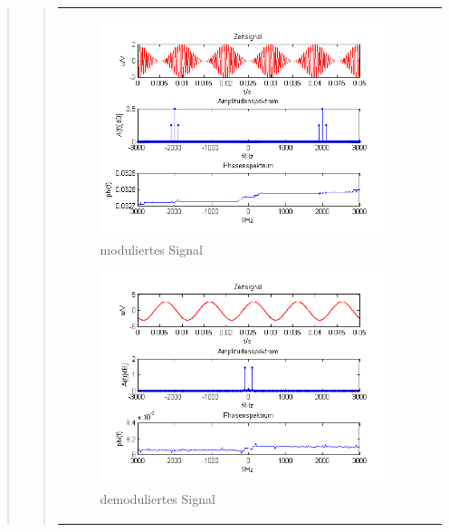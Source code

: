 \begin{quote}
\begin{quote}
\begin{center}
\begin{tabular}{ll}
\begin{minipage}{0.67\textwidth}
                \begin{figure}[H]
                    \includegraphics[scale=0.7]{Bilder/Am_Cos_2k_100Hz_mo}
                    \caption{moduliertes Signal}
                    \label{fig:DemocosinusmT}
                \end{figure}
        
            \end{minipage}
        
            \begin{minipage}{0.67\textwidth}
                \begin{figure}[H]
                    \includegraphics[scale=0.7]{Bilder/Demo_Sin_2k_100Hz_mo_mitTiefpass}
                    \caption{demoduliertes Signal}
                    \label{fig:DemocosinusmT2}
                \end{figure}
        

\end{minipage}
\end{tabular}
\end{center}
\end{quote}
\end{quote}
